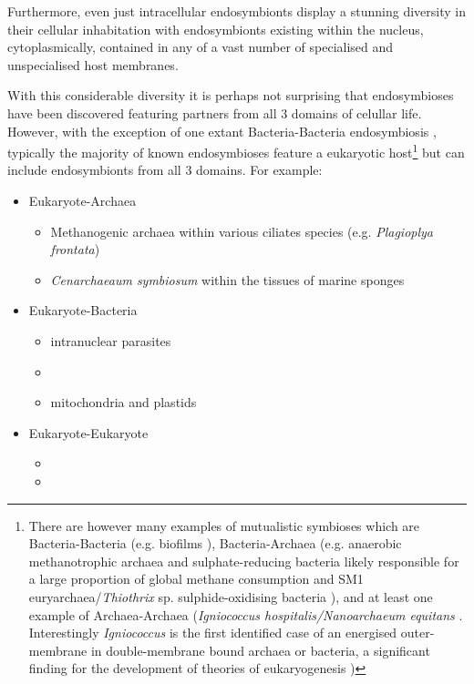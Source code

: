 Furthermore, even just intracellular endosymbionts display a stunning diversity in their cellular inhabitation with endosymbionts existing
within the nucleus, cytoplasmically, contained in any of a vast number of specialised and unspecialised host membranes.


With this considerable diversity it is perhaps not surprising that endosymbioses have been discovered featuring partners from all 3 domains of celullar life. %
However, with the exception of one extant Bacteria-Bacteria endosymbiosis \citep{vonDohlen2001}, typically the majority of known
endosymbioses feature a eukaryotic host\footnote{There are however many examples of mutualistic symbioses which are Bacteria-Bacteria (e.g. biofilms \citep{Watnick2000}),
    Bacteria-Archaea (e.g. anaerobic methanotrophic archaea and sulphate-reducing bacteria likely responsible
    for a large proportion of global methane consumption \citep{Boetius2000,Knittel2009} and SM1 euryarchaea/\textit{Thiothrix} sp. sulphide-oxidising bacteria \citep{Henneberger2006,Wrede2012}), 
    and at least one example of Archaea-Archaea (\textit{Igniococcus hospitalis/Nanoarchaeum equitans} \citep{Huber2002}. 
Interestingly \textit{Igniococcus} is the first identified case of an energised outer-membrane in double-membrane bound archaea or bacteria, a significant finding for the development of theories of
eukaryogenesis \citep{Kuper2010})} but can include endosymbionts from all 3 domains.
For example:
\begin{itemize}
    \item Eukaryote-Archaea \citep{Moissl-Eichinger2011}
    \begin{itemize}
        \item Methanogenic archaea within various ciliates species (e.g. \textit{Plagioplya frontata}) \citep{Fenchel1992,Lange2005}
        \item \textit{Cenarchaeaum symbiosum} within the tissues of marine sponges \citep{Preston1996,Wrede2012}
    \end{itemize}
        \item Eukaryote-Bacteria 
    \begin{itemize}
         \item intranuclear parasites
         \item 
         \item mitochondria and plastids
    \end{itemize}
    \item Eukaryote-Eukaryote
    \begin{itemize}
         \item
         \item
    \end{itemize}
\end{itemize}


